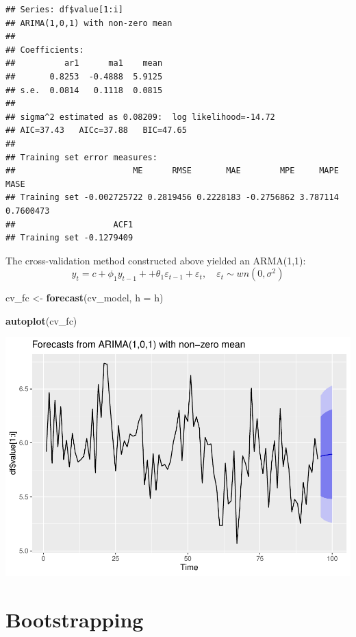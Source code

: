 \documentclass[]{article}
\newenvironment{Shaded}{\begin{snugshade}}{\end{snugshade}}
\newcommand{\DataTypeTok}[1]{\textcolor[rgb]{0.13,0.29,0.53}{#1}}
\newcommand{\KeywordTok}[1]{\textcolor[rgb]{0.13,0.29,0.53}{\textbf{#1}}}
\newcommand{\NormalTok}[1]{#1}
\newcommand{\StringTok}[1]{\textcolor[rgb]{0.31,0.60,0.02}{#1}}
\begin{document}
\begin{verbatim}
## Series: df$value[1:i] 
## ARIMA(1,0,1) with non-zero mean 
## 
## Coefficients:
##          ar1      ma1    mean
##       0.8253  -0.4888  5.9125
## s.e.  0.0814   0.1118  0.0815
## 
## sigma^2 estimated as 0.08209:  log likelihood=-14.72
## AIC=37.43   AICc=37.88   BIC=47.65
## 
## Training set error measures:
##                        ME      RMSE       MAE        MPE     MAPE      MASE
## Training set -0.002725722 0.2819456 0.2228183 -0.2756862 3.787114 0.7600473
##                    ACF1
## Training set -0.1279409
\end{verbatim}

The cross-validation method constructed above yielded an ARMA(1,1):
\[ y_t = c + \phi_1 y_{t-1} +  + \theta_1 \varepsilon_{t-1} + \varepsilon_t, \hspace{1em} \varepsilon_t \sim wn(0, \sigma^2)\]

\begin{Shaded}
\begin{Highlighting}[]
\NormalTok{cv_fc <-}\StringTok{ }\KeywordTok{forecast}\NormalTok{(cv_model, }\DataTypeTok{h =}\NormalTok{ h)}

\KeywordTok{autoplot}\NormalTok{(cv_fc)}
\end{Highlighting}
\end{Shaded}

\includegraphics{Econo2_P4_files/figure-latex/forecast cv plot-1.pdf}

\section{Bootstrapping}
\end{document}
